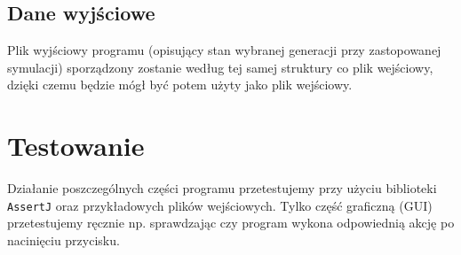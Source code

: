 \documentclass[a4paper,11pt, notitlepage ]{article}
\begin{document}
\subsection{Dane wyjściowe}
Plik wyjściowy programu (opisujący stan wybranej generacji przy zastopowanej symulacji) sporządzony zostanie według tej samej struktury co plik wejściowy, dzięki czemu będzie mógł być potem użyty jako plik wejściowy. 

\section{Testowanie}
Działanie poszczególnych części programu przetestujemy przy użyciu biblioteki \verb+AssertJ+ oraz przykładowych plików wejściowych. Tylko część graficzną (GUI) przetestujemy ręcznie np. sprawdzając czy program wykona odpowiednią akcję po nacinięciu przycisku.
\end{document}
